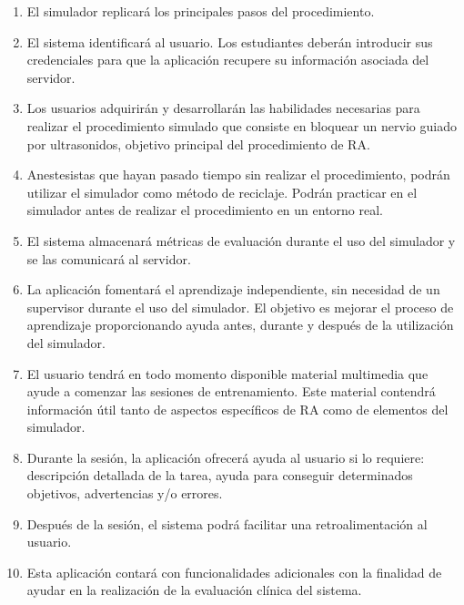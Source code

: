 \begin{enumerate}
    
\item El simulador replicará los principales pasos del procedimiento.
\item El sistema identificará al usuario. Los estudiantes deberán introducir sus credenciales para que la aplicación recupere su información asociada del servidor.
\item Los usuarios adquirirán y desarrollarán las habilidades necesarias para realizar el procedimiento simulado que consiste en bloquear un nervio guiado por ultrasonidos, objetivo principal del procedimiento de \ac{RA}.
\item Anestesistas que hayan pasado tiempo sin realizar el procedimiento, podrán utilizar el simulador como método de reciclaje. Podrán practicar en el simulador antes de realizar el procedimiento en un entorno real. 
\item  El sistema almacenará métricas de evaluación durante el uso del simulador y se las comunicará al servidor.
\item  La aplicación fomentará el aprendizaje independiente, sin necesidad de un supervisor durante el uso del simulador. El objetivo es mejorar el proceso de aprendizaje proporcionando ayuda antes, durante y después de la utilización del simulador. 

\item El usuario tendrá en todo momento disponible material multimedia que ayude a comenzar las sesiones de entrenamiento. Este material contendrá información útil tanto de aspectos específicos de \ac{RA} como de elementos del simulador.
\item Durante la sesión, la aplicación ofrecerá ayuda al usuario si lo requiere: descripción detallada de la tarea, ayuda para conseguir determinados objetivos, advertencias y/o errores.
\item Después de la sesión, el sistema podrá facilitar una retroalimentación al usuario.
\item Esta aplicación contará con funcionalidades adicionales con la finalidad de ayudar en la realización de la evaluación clínica del sistema.
\end{enumerate}





